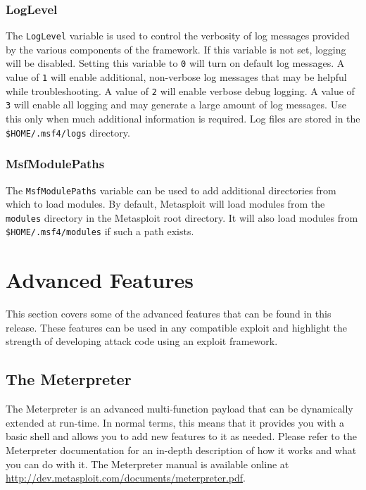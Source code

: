 \documentclass{report}
\begin{document}
	\subsection{LogLevel}

\par
The \texttt{LogLevel} variable is used to control the verbosity of log messages
provided by the various components of the framework. If this variable is not
set, logging will be disabled. Setting this variable to \texttt{0} will turn on
default log messages. A value of \texttt{1} will enable additional, non-verbose
log messages that may be helpful while troubleshooting. A value of \texttt{2}
will enable verbose debug logging. A value of \texttt{3} will enable all logging
and may generate a large amount of log messages. Use this only when much
additional information is required. Log files are stored in the
\texttt{\$HOME/.msf4/logs} directory.

	\subsection{MsfModulePaths}

\par
The \texttt{MsfModulePaths} variable can be used to add additional directories
from which to load modules. By default, Metasploit will load modules from the
\texttt{modules} directory in the Metasploit root directory. It will also load
modules from \texttt{\$HOME/.msf4/modules} if such a path exists.

\pagebreak

\chapter{Advanced Features}

\par
This section covers some of the advanced features that can be found in this
release. These features can be used in any compatible exploit and highlight the
strength of developing attack code using an exploit framework.

\section{The Meterpreter}

\par
The Meterpreter is an advanced multi-function payload that can be dynamically
extended at run-time. In normal terms, this means that it provides you with a
basic shell and allows you to add new features to it as needed. Please refer to
the Meterpreter documentation for an in-depth description of how it works and
what you can do with it. The Meterpreter manual is available online at
\url{http://dev.metasploit.com/documents/meterpreter.pdf}.
\end{document}
